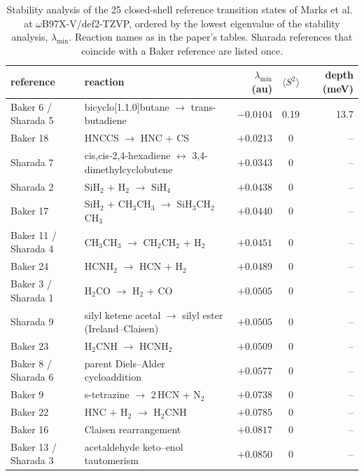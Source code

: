\begin{table}[h]
\centering
\small
\caption{Stability analysis of the 25 closed-shell reference
transition states of Marks et al.~\cite{marks2026} at
\mbox{$\omega$B97X-V/def2-TZVP}, ordered by the lowest eigenvalue of
the stability analysis, $\lambda_{\min}$. Reaction names as in the
paper's tables. Sharada references that coincide with a Baker
reference are listed once.}
\label{tab:marks-stability}
\begin{tabular}{@{}llrcr@{}}
\toprule
reference & reaction & $\lambda_{\min}$ (au) & $\langle S^2\rangle$ & depth (meV) \\
\midrule
Baker 6 / Sharada 5 & bicyclo[1.1.0]butane $\rightarrow$ trans-butadiene & $-0.0104$ & 0.19 & 13.7 \\
\midrule
Baker 18  & HNCCS $\rightarrow$ HNC + CS                          & $+0.0213$ & 0 & -- \\
Sharada 7 & cis,cis-2,4-hexadiene $\leftrightarrow$ 3,4-dimethylcyclobutene & $+0.0343$ & 0 & -- \\
Sharada 2 & SiH$_2$ + H$_2$ $\rightarrow$ SiH$_4$                & $+0.0438$ & 0 & -- \\
Baker 17  & SiH$_2$ + CH$_3$CH$_3$ $\rightarrow$ SiH$_3$CH$_2$CH$_3$ & $+0.0440$ & 0 & -- \\
Baker 11 / Sharada 4 & CH$_3$CH$_3$ $\rightarrow$ CH$_2$CH$_2$ + H$_2$ & $+0.0451$ & 0 & -- \\
Baker 24  & HCNH$_2$ $\rightarrow$ HCN + H$_2$                     & $+0.0489$ & 0 & -- \\
Baker 3 / Sharada 1 & H$_2$CO $\rightarrow$ H$_2$ + CO             & $+0.0505$ & 0 & -- \\
Sharada 9 & silyl ketene acetal $\rightarrow$ silyl ester (Ireland--Claisen) & $+0.0505$ & 0 & -- \\
Baker 23  & H$_2$CNH $\rightarrow$ HCNH$_2$                        & $+0.0509$ & 0 & -- \\
Baker 8 / Sharada 6 & parent Diels--Alder cycloaddition           & $+0.0577$ & 0 & -- \\
Baker 9   & s-tetrazine $\rightarrow$ 2\,HCN + N$_2$               & $+0.0738$ & 0 & -- \\
Baker 22  & HNC + H$_2$ $\rightarrow$ H$_2$CNH                     & $+0.0785$ & 0 & -- \\
Baker 16  & Claisen rearrangement                                  & $+0.0817$ & 0 & -- \\
Baker 13 / Sharada 3 & acetaldehyde keto--enol tautomerism         & $+0.0850$ & 0 & -- \\

\end{tabular}
\end{table}
